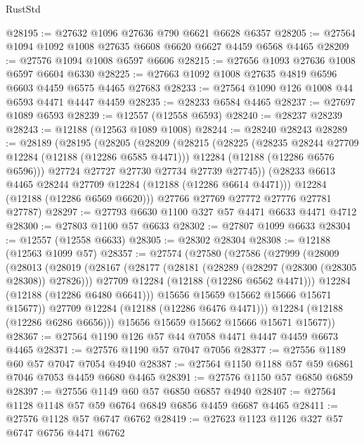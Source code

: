 \begin{lexlean}{RustStd}
\begin{coremodule}
@28195 := @27632 @1096 @27636 @790 @6621 @6628 @6357
@28205 := @27564 @1094 @1092 @1008 @27635 @6608 @6620 @6627 @4459 @6568 @4465
@28209 := @27576 @1094 @1008 @6597 @6606
@28215 := @27656 @1093 @27636 @1008 @6597 @6604 @6330
@28225 := @27663 @1092 @1008 @27635 @4819 @6596 @6603 @4459 @6575 @4465 @27683
@28233 := @27564 @1090 @126 @1008 @44 @6593 @4471 @4447 @4459
@28235 := @28233 @6584 @4465
@28237 := @27697 @1089 @6593
@28239 := @12557 (@12558 @6593)
@28240 := @28237 @28239
@28243 := @12188 (@12563 @1089 @1008)
@28244 := @28240 @28243
@28289 := @28189
    (@28195
      (@28205
        (@28209
          (@28215
            (@28225
              (@28235 @28244 @27709 @12284 (@12188 (@12286 @6585 @4471)))
              @12284
              (@12188 (@12286 @6576 @6596)))
            @27724
            @27727
            @27730
            @27734
            @27739
            @27745))
        (@28233 @6613 @4465 @28244 @27709 @12284 (@12188 (@12286 @6614 @4471)))
        @12284
        (@12188 (@12286 @6569 @6620)))
      @27766
      @27769
      @27772
      @27776
      @27781
      @27787)
@28297 := @27793 @6630 @1100 @327 @57 @4471 @6633 @4471 @4712
@28300 := @27803 @1100 @57 @6633
@28302 := @27807 @1099 @6633
@28304 := @12557 (@12558 @6633)
@28305 := @28302 @28304
@28308 := @12188 (@12563 @1099 @57)
@28357 := @27574
    (@27580
      (@27586
        (@27999
          (@28009
            (@28013
              (@28019
                (@28167
                  (@28177
                    (@28181 (@28289 (@28297 (@28300 (@28305 @28308)) @27826)))
                    @27709
                    @12284
                    (@12188 (@12286 @6562 @4471)))
                  @12284
                  (@12188 (@12286 @6480 @6641)))
                @15656
                @15659
                @15662
                @15666
                @15671
                @15677))
            @27709
            @12284
            (@12188 (@12286 @6476 @4471)))
          @12284
          (@12188 (@12286 @6286 @6656)))
        @15656
        @15659
        @15662
        @15666
        @15671
        @15677))
@28367 := @27564 @1190 @126 @57 @44 @7058 @4471 @4447 @4459 @6673 @4465
@28371 := @27576 @1190 @57 @7047 @7056
@28377 := @27556 @1189 @60 @57 @7047 @7054 @4940
@28387 := @27564 @1150 @1188 @57 @59 @6861 @7046 @7053 @4459 @6680 @4465
@28391 := @27576 @1150 @57 @6850 @6859
@28397 := @27556 @1149 @60 @57 @6850 @6857 @4940
@28407 := @27564 @1128 @1148 @57 @59 @6764 @6849 @6856 @4459 @6687 @4465
@28411 := @27576 @1128 @57 @6747 @6762
@28419 := @27623 @1123 @1126 @327 @57 @6747 @6756 @4471 @6762

\end{coremodule}
\end{lexlean}
